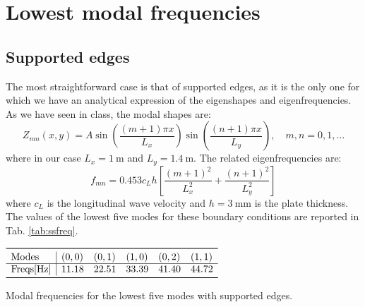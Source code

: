 \documentclass[a4paper]{article}
\begin{document}
\begin{titlepage}
	
	\vfill\vfill
	
	
	\vfill %
	
	
\end{titlepage}


\section{Lowest modal frequencies}
\subsection{Supported edges}
The most straightforward case is that of supported edges, as it is the only one for which we have an analytical expression of the eigenshapes and eigenfrequencies. As we have seen in class, the modal shapes are:
$$ Z_{mn}(x, y) = A\sin\left( 	\frac{(m+1)\pi x}{L_x} \right) \sin\left( 	\frac{(n+1)\pi x}{L_y} \right), \quad m,n = 0, 1, \dots$$
where in our case $L_x = \SI{1}{\meter}$ and $L_y = \SI{1.4}{\meter}$.
The related eigenfrequencies are:
$$ f_{mn} = 0.453c_L h \left[\frac{(m+1)^2}{L_x^2} + \frac{(n+1)^2}{L_y^2}\right] $$
where $c_L$ is the longitudinal wave velocity and $h = \SI{3}{\milli\meter}$ is the plate thickness. The values of the lowest five modes for these boundary conditions are reported in Tab. \ref{tab:ssfreq}.

\begin{table}[h]
	\centering
	$\begin{array}{l|lllll}
		\toprule
		\text{Modes} & (0,0) & (0,1) & (1,0) & (0,2) & (1,1) \\
		\hline
		\text{Freqs[Hz]} & 11.18 & 22.51 & 33.39 & 41.40 & 44.72\\
		\bottomrule
	\end{array}$
	\caption{Modal frequencies for the lowest five modes with supported edges.}
	\label{tab:ssfreq}
\end{table}
\end{document}
